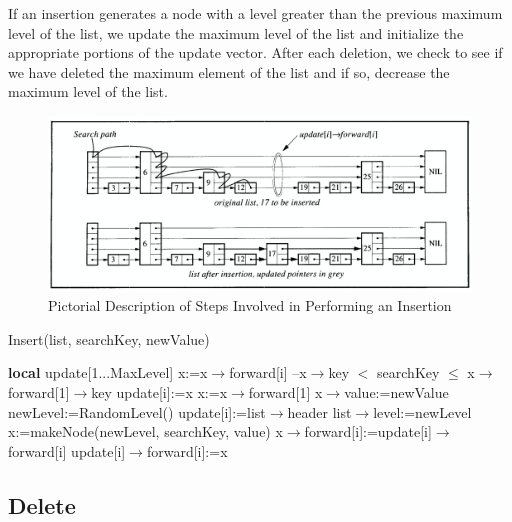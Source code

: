 \documentclass[10pt,english, openany]{book}
\begin{document}
If an insertion generates a node with a level greater than the previous maximum level of the list, we update the maximum level of the list and initialize the appropriate portions of the update vector. After each deletion, we check to see if we have deleted the maximum element of the list and if so, decrease the maximum level of the list.

\begin{figure}[h]
	\centering
	\includegraphics[scale=0.5]{Figures/Insertion}
	\caption{Pictorial Description of Steps Involved in Performing an Insertion}
\end{figure}
\begin{algorithm}[htb]
\caption{Insert(list, searchKey, newValue)}	
\begin{algorithmic}[1]
	 \Require
	 \Ensure
	 \State \textbf{local} update[1...MaxLevel]
	 \State x:=x$\rightarrow$forward[i]
	 \State --x$\rightarrow$key $<$ searchKey $\leq$ x$\rightarrow$forward[1]$\rightarrow$key
	 \EndWhile
	 \State update[i]:=x
	 \EndFor
	 \State x:=x$\rightarrow$forward[1]
	 \State x$\rightarrow$value:=newValue
	 \Else
	 \State newLevel:=RandomLevel()
	 \State update[i]:=list$\rightarrow$header
	 \EndFor
	 \State list$\rightarrow$level:=newLevel
	 \EndIf
	 \State x:=makeNode(newLevel, searchKey, value)
	 \State x$\rightarrow$forward[i]:=update[i]$\rightarrow$forward[i]
	 \State update[i]$\rightarrow$forward[i]:=x
	 \EndFor
	 \EndIf
\end{algorithmic}
\end{algorithm}

\subsection{Delete}
\end{document}
